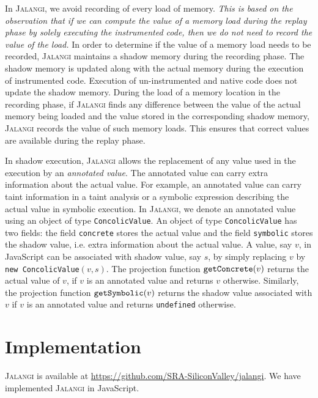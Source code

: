 \documentclass{sig-alternate}
\def\jalangi{\textsc{Jalangi}}
\newcommand \Actual{{\tt getConcrete}}
\newcommand \Shadow{{\tt getSymbolic}}
\begin{document}
In \jalangi{}, we avoid recording of every load of memory.  \emph{This
  is based on the observation that if we can compute the value of a
  memory load during the replay phase by solely executing the
  instrumented code, then we do not need to record the value of the
  load.}  In order to determine if the value of a memory load needs to
be recorded, \jalangi{} maintains a shadow memory during the recording
phase.  The shadow memory is updated along with the actual memory
during the execution of instrumented code.  Execution of
un-instrumented and native code does not update the shadow memory.
During the load of a memory location in the recording phase, if
\jalangi{} finds any difference between the value of the actual memory
being loaded and the value stored in the corresponding shadow memory,
\jalangi{} records the value of such memory loads. This ensures that
correct values are available during the replay phase.

In shadow execution, \jalangi{} allows the replacement of any value
used in the execution by an \emph{annotated value}.  The annotated
value can carry extra information about the actual value.  For
example, an annotated value can carry taint information in a taint
analysis or a symbolic expression describing the actual value in
symbolic execution.  In \jalangi{}, we denote an annotated value using
an object of type \texttt{ConcolicValue}.  An object of type
\texttt{ConcolicValue} has two fields: the field \texttt{concrete}
stores the actual value and the field \texttt{symbolic} stores the
shadow value, i.e. extra information about the actual value.  A value,
say $v$, in JavaScript can be associated with shadow value, say $s$,
by simply replacing $v$ by \texttt{new ConcolicValue}$(v, s)$.  The
projection function $\Actual(v)$ returns the actual value of $v$, if
$v$ is an annotated value and returns $v$ otherwise.  Similarly, the
projection function $\Shadow(v)$ returns the shadow value associated
with $v$ if $v$ is an annotated value and returns \texttt{undefined}
otherwise.


\section{Implementation}
\label{sec:implementation}

\jalangi{} is available at
\url{https://github.com/SRA-SiliconValley/jalangi}.  We have
implemented \jalangi{} in JavaScript.
\end{document}
